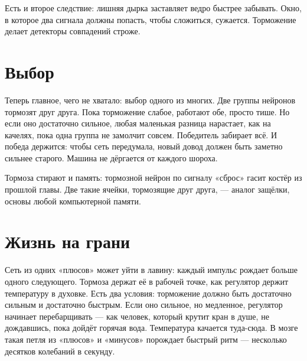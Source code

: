 
Есть и второе следствие: лишняя дырка заставляет ведро быстрее забывать. Окно, в которое два сигнала должны попасть, чтобы сложиться, сужается. Торможение делает детекторы совпадений строже.

\section*{Выбор}

Теперь главное, чего не хватало: выбор одного из многих. Две группы нейронов тормозят друг друга. Пока торможение слабое, работают обе, просто тише. Но если оно достаточно сильное, любая маленькая разница нарастает, как на качелях, пока одна группа не замолчит совсем. Победитель забирает всё. И победа держится: чтобы сеть передумала, новый довод должен быть заметно сильнее старого. Машина не дёргается от каждого шороха.

Тормоза стирают и память: тормозной нейрон по сигналу «сброс» гасит костёр из прошлой главы. Две такие ячейки, тормозящие друг друга, --- аналог защёлки, основы любой компьютерной памяти.

\section*{Жизнь на грани}

Сеть из одних «плюсов» может уйти в лавину: каждый импульс рождает больше одного следующего. Тормоза держат её в рабочей точке, как регулятор держит температуру в духовке. Есть два условия: торможение должно быть достаточно сильным и достаточно быстрым. Если оно сильное, но медленное, регулятор начинает перебарщивать --- как человек, который крутит кран в душе, не дождавшись, пока дойдёт горячая вода. Температура качается туда-сюда. В мозге такая петля из «плюсов» и «минусов» порождает быстрый ритм --- несколько десятков колебаний в секунду.

